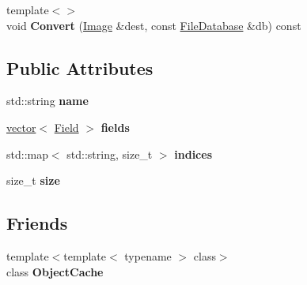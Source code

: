 \begin{DoxyCompactItemize}
\item 
\hypertarget{class_assimp_1_1_blender_1_1_structure_ad067f1a405e01e8dd8f2e7e3b1cf8263}{{\footnotesize template$<$$>$ }\\void {\bfseries Convert} (\hyperlink{struct_assimp_1_1_blender_1_1_image}{Image} \&dest, const \hyperlink{class_assimp_1_1_blender_1_1_file_database}{File\+Database} \&db) const }\label{class_assimp_1_1_blender_1_1_structure_ad067f1a405e01e8dd8f2e7e3b1cf8263}

\end{DoxyCompactItemize}
\subsection*{Public Attributes}
\begin{DoxyCompactItemize}
\item 
\hypertarget{class_assimp_1_1_blender_1_1_structure_a379e2321614bda655d004d10415471c3}{std\+::string {\bfseries name}}\label{class_assimp_1_1_blender_1_1_structure_a379e2321614bda655d004d10415471c3}

\item 
\hypertarget{class_assimp_1_1_blender_1_1_structure_a7380fd409dafc17e01cb8ce91db0436e}{\hyperlink{class_assimp_1_1_blender_1_1vector}{vector}$<$ \hyperlink{struct_assimp_1_1_blender_1_1_field}{Field} $>$ {\bfseries fields}}\label{class_assimp_1_1_blender_1_1_structure_a7380fd409dafc17e01cb8ce91db0436e}

\item 
\hypertarget{class_assimp_1_1_blender_1_1_structure_af93f00a82e9a798be8eb5ccf2c054f6d}{std\+::map$<$ std\+::string, size\+\_\+t $>$ {\bfseries indices}}\label{class_assimp_1_1_blender_1_1_structure_af93f00a82e9a798be8eb5ccf2c054f6d}

\item 
\hypertarget{class_assimp_1_1_blender_1_1_structure_af5ff18444b744b2bf425f809eba3c116}{size\+\_\+t {\bfseries size}}\label{class_assimp_1_1_blender_1_1_structure_af5ff18444b744b2bf425f809eba3c116}

\end{DoxyCompactItemize}
\subsection*{Friends}
\begin{DoxyCompactItemize}
\item 
\hypertarget{class_assimp_1_1_blender_1_1_structure_a48243f0835295529aaf2c25f8ea9d3f6}{{\footnotesize template$<$template$<$ typename $>$ class$>$ }\\class {\bfseries Object\+Cache}}\label{class_assimp_1_1_blender_1_1_structure_a48243f0835295529aaf2c25f8ea9d3f6}

\end{DoxyCompactItemize}



